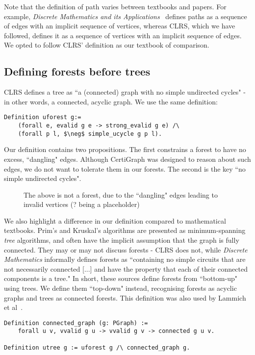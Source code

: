 Note that the definition of path varies between textbooks and papers. For example, \textit{Discrete Mathematics and its Applications}~\cite{rozen} defines paths as a sequence of edges with an implicit sequence of vertices, whereas CLRS, which we have followed, defines it as a sequence of vertices with an implicit sequence of edges. We opted to follow CLRS' definition as our textbook of comparison.

\subsection{Defining forests before trees}

CLRS defines a tree as ``a (connected) graph with no simple undirected cycles" - in other words, a connected, acyclic graph. We use the same definition:
\begin{lstlisting}
Definition uforest g:=
	(forall e, evalid g e -> strong_evalid g e) /\
	(forall p l, $\neg$ simple_ucycle g p l).
\end{lstlisting}
Our definition contains two propositions. The first constrains a forest to have no excess, ``dangling" edges. Although CertiGraph was designed to reason about such edges, we do not want to tolerate them in our forests. The second is the key ``no simple undirected cycles".
\begin{figure}[H]
	\caption{The above is not a forest, due to the ``dangling" edges leading to invalid vertices (? being a placeholder)}
\end{figure}
We also highlight a difference in our definition compared to mathematical textbooks. Prim's and Kruskal's algorithms are presented as minimum-spanning \textit{tree} algorithms, and often have the implicit assumption that the graph is fully connected. They may or may not discuss forests - CLRS does not, while \textit{Discrete Mathematics} informally defines forests as ``containing no simple circuits that are not necessarily connected [...] and have the property that each of their connected components is a tree." In short, these sources define forests from ``bottom-up" using trees. We define them ``top-down" instead, recognising forests as acyclic graphs and trees as connected forests. This definition was also used by Lammich et al~\cite{DBLP:journals/afp/LammichN19}.
\begin{lstlisting}
Definition connected_graph (g: PGraph) :=
	forall u v, vvalid g u -> vvalid g v -> connected g u v.

Definition utree g := uforest g /\ connected_graph g.
\end{lstlisting} 


